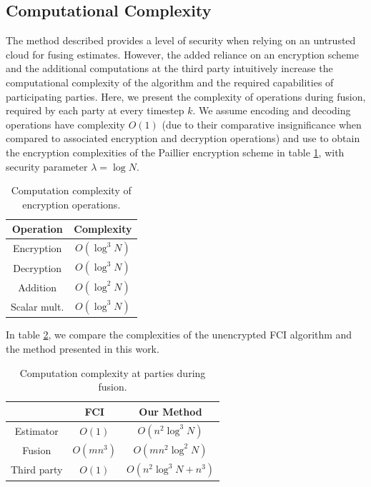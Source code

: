 % 
% 

\subsection{Computational Complexity}\label{sec:complexity}
The method described provides a level of security when relying on an untrusted cloud for fusing estimates. However, the added reliance on an encryption scheme and the additional computations at the third party intuitively increase the computational complexity of the algorithm and the required capabilities of participating parties. Here, we present the complexity of operations during fusion, required by each party at every timestep $k$. We assume encoding and decoding operations have complexity $O(1)$ (due to their comparative insignificance when compared to associated encryption and decryption operations) and use \cite{paillierPublicKeyCryptosystemsBased1999} to obtain the encryption complexities of the Paillier encryption scheme in table \ref{tab:enc_cmplx}, with security parameter $\lambda = \log{N}$.
\begin{table}[tb]
    \centering
    \caption{Computation complexity of encryption operations.}
    \label{tab:enc_cmplx}
    \begin{tabular}{|c|c|}
       \hline
       \textbf{Operation} & \textbf{Complexity} \\ 
       \hline
       Encryption & $O(\log^3{N})$ \\ 
       Decryption & $O(\log^3{N})$ \\ 
       Addition & $O(\log^2{N})$ \\ 
       Scalar mult. & $O(\log^3{N})$ \\ 
       \hline
    \end{tabular}
 \end{table}
In table \ref{tab:fus_cmplx}, we compare the complexities of the unencrypted FCI algorithm and the method presented in this work.
\begin{table}[tb]
    \centering
    \caption{Computation complexity at parties during fusion.}
    \label{tab:fus_cmplx}
    \begin{tabular}{ |c|c|c| }
       \hline
        & \textbf{FCI} & \textbf{Our Method} \\ 
       \hline
       Estimator & $O(1)$ & $O\left(n^2\log^3{N}\right)$ \\ 
       Fusion & $O(mn^3)$ & $O\left(mn^2\log^2{N}\right)$ \\ 
       Third party & $O(1)$ & $O\left(n^2\log^3{N} + n^3\right)$ \\ 
       \hline
    \end{tabular}
 \end{table}
